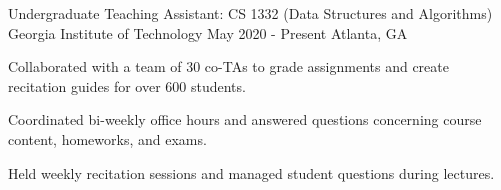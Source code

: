 \begin{cventries}
\cventry
{Undergraduate Teaching Assistant: CS 1332 (Data Structures and Algorithms)} %
{Georgia Institute of Technology} %
{May 2020 - Present} %
{Atlanta, GA} %
{ %
\begin{cvitems}
    \item Collaborated with a team of 30 co-TAs to grade assignments and create recitation guides for over 600 students. 
    \item Coordinated bi-weekly office hours and answered
    questions concerning course content, homeworks, and exams.
    \item Held weekly recitation sessions and managed student questions during lectures.
\end{cvitems}
}






\end{cventries}

